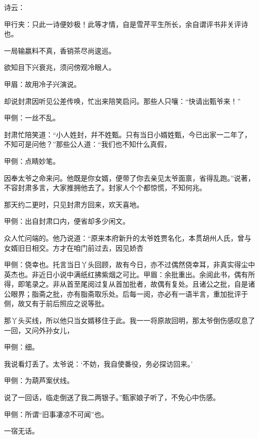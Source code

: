 \begin{parag}
    诗云：\begin{note}甲行夹：只此一诗便妙极！此等才情，自是雪芹平生所长，余自谓评书非关评诗也。\end{note}
\end{parag}


\begin{poem}
    \begin{pl}一局输嬴料不真，香销茶尽尚逡巡。\end{pl}

    \begin{pl}欲知目下兴衰兆，须问傍观冷眼人。\end{pl}\begin{note}甲眉：故用冷子兴演说。\end{note}
\end{poem}


\begin{parag}
    却说封肃因听见公差传唤，忙出来陪笑启问。那些人只嚷：“快请出甄爷来！”\begin{note}甲侧：一丝不乱。\end{note}封肃忙陪笑道：“小人姓封，幷不姓甄。只有当日小婿姓甄，今已出家一二年了，不知可是问他？”那些公人道：“我们也不知什么真假，\begin{note}甲侧：点睛妙笔。\end{note}因奉太爷之命来问。他既是你女婿，便带了你去亲见太爷面禀，省得乱跑。”说著，不容封肃多言，大家推拥他去了。封家人个个都惊慌，不知何兆。
\end{parag}


\begin{parag}
    那天约二更时，只见封肃方回来，欢天喜地。\begin{note}甲侧：出自封肃口内，便省却多少闲文。\end{note}众人忙问端的。他乃说道：“原来本府新升的太爷姓贾名化，本贯胡州人氏，曾与女婿旧日相交。方才在咱门前过去，因见娇杏\begin{note}甲侧：侥幸也。托言当日丫头回顾，故有今日，亦不过偶然侥幸耳，非真实得尘中英杰也。非近日小说中满纸红拂紫烟之可比。甲眉：余批重出。余阅此书，偶有所得，即笔录之。非从首至尾阅过复从首加批者，故偶有复处。且诸公之批，自是诸公眼界；脂斋之批，亦有脂斋取乐处。后每一阅，亦必有一语半言，重加批评于侧，故又有于前后照应之说等批。\end{note}那丫头买线，所以他只当女婿移住于此。我一一将原故回明，那太爷倒伤感叹息了一回，又问外孙女儿，\begin{note}甲侧：细。\end{note}我说看灯丢了。太爷说：‘不妨，我自使番役，务必探访回来。’\begin{note}甲侧：为葫芦案伏线。\end{note}说了一回话，临走倒送了我二两银子。”甄家娘子听了，不免心中伤感。\begin{note}甲侧：所谓“旧事凄凉不可闻”也。\end{note}一宿无话。
\end{parag}


